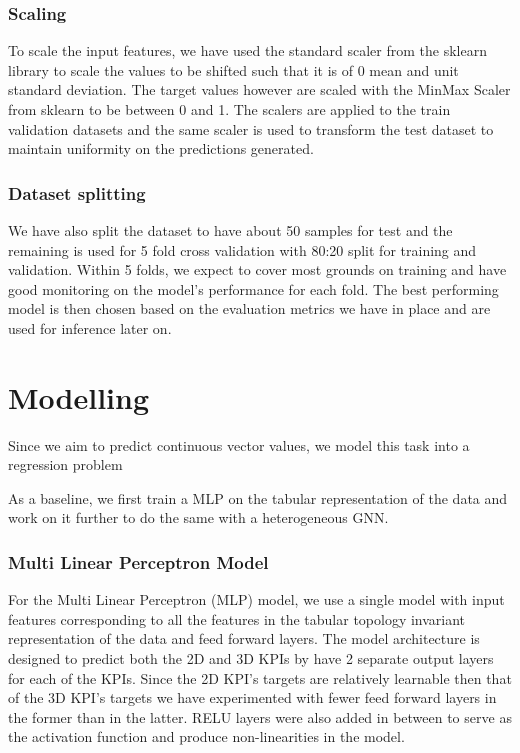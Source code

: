 \documentclass{report} %
\begin{document}
\subsection*{Scaling}
To scale the input features, we have used the standard scaler from the sklearn library to scale the values to be shifted such that it is of 0 mean and unit standard deviation.
The target values however are scaled with the MinMax Scaler from sklearn to be between 0 and 1.
The scalers are applied to the train validation datasets and the same scaler is used to transform the test dataset to maintain uniformity on the predictions generated.

\subsection*{Dataset splitting}

We have also split the dataset to have about 50 samples for test and the remaining is used for 5 fold cross validation with 80:20 split for training and validation.
Within 5 folds, we expect to cover most grounds on training and have good monitoring on the model's performance for each fold.
The best performing model is then chosen based on the evaluation metrics we have in place and are used for inference later on.

\newpage 

\chapter*{Modelling}
Since we aim to predict continuous vector values, we model this task into a regression problem

As a baseline, we first train a MLP on the tabular representation of the data and work on it further to do the same with a heterogeneous GNN.
\subsection*{Multi Linear Perceptron Model}

For the Multi Linear Perceptron (MLP) model, we use a single model with input features corresponding to all the features in the tabular topology invariant representation of the data and feed forward layers.
The model architecture is designed to predict both the 2D and 3D KPIs by have 2 separate output layers for each of the KPIs. 
Since the 2D KPI's targets are relatively learnable then that of the 3D KPI's targets we have experimented with fewer feed forward layers in the former than in the latter.
RELU layers were also added in between to serve as the activation function and produce non-linearities in the model.
\end{document}
